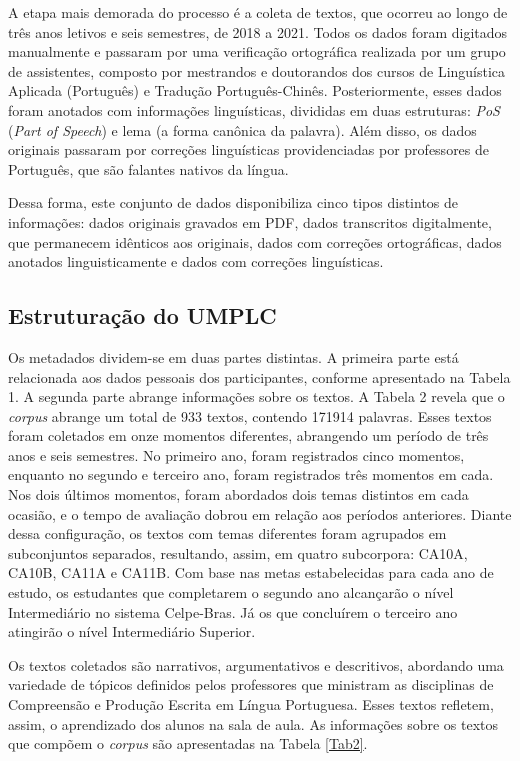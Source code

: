 \documentclass[portuguese]{textolivre}
\begin{document}
A etapa mais demorada do processo é a coleta de textos, que ocorreu ao longo de três anos letivos e seis semestres, de 2018 a 2021. Todos os dados foram digitados manualmente e passaram por uma verificação ortográfica realizada por um grupo de assistentes, composto por mestrandos e doutorandos dos cursos de Linguística Aplicada (Português) e Tradução Português-Chinês. Posteriormente, esses dados foram anotados com informações linguísticas, divididas em duas estruturas: \textit{PoS} (\textit{Part of Speech}) e lema (a forma canônica da palavra). Além disso, os dados originais passaram por correções linguísticas providenciadas por professores de Português, que são falantes nativos da língua.

Dessa forma, este conjunto de dados disponibiliza cinco tipos distintos de informações: dados originais gravados em PDF, dados transcritos digitalmente, que permanecem idênticos aos originais, dados com correções ortográficas, dados anotados linguisticamente e dados com correções linguísticas.

\subsection{Estruturação do UMPLC}
Os metadados dividem-se em duas partes distintas. A primeira parte está relacionada aos dados pessoais dos participantes, conforme apresentado na Tabela 1. A segunda parte abrange informações sobre os textos. A Tabela 2 revela que o \textit{corpus} abrange um total de 933 textos, contendo 171914
 palavras. Esses textos foram coletados em onze momentos diferentes, abrangendo um período de três anos e seis semestres. No primeiro ano, foram registrados cinco momentos, enquanto no segundo e terceiro ano, foram registrados três momentos em cada. Nos dois últimos momentos, foram abordados dois temas distintos em cada ocasião, e o tempo de avaliação dobrou em relação aos períodos anteriores. Diante dessa configuração, os textos com temas diferentes foram agrupados em subconjuntos separados, resultando, assim, em quatro subcorpora: CA10A, CA10B, CA11A e CA11B. Com base nas metas estabelecidas para cada ano de estudo, os estudantes que completarem o segundo ano alcançarão o nível Intermediário no sistema Celpe-Bras. Já os que concluírem o terceiro ano atingirão o nível Intermediário Superior.

Os textos coletados são narrativos, argumentativos e descritivos, abordando uma variedade de tópicos definidos pelos professores que ministram as disciplinas de Compreensão e Produção Escrita em Língua Portuguesa. Esses textos refletem, assim, o aprendizado dos alunos na sala de aula. As informações sobre os textos que compõem o \textit{corpus} são apresentadas na Tabela \ref{Tab2}.
\end{document}
